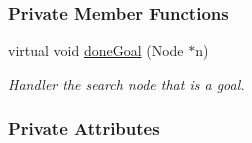 \subsubsection*{Private Member Functions}
\begin{DoxyCompactItemize}
\item 
virtual void \hyperlink{structslb_1_1ext_1_1policy_1_1goalHandler_1_1SingleGoal_ad6a96ee6aa23de81c67f7714c51effae}{done\+Goal} (Node $\ast$n)
\begin{DoxyCompactList}\small\item\em Handler the search node that is a goal. \end{DoxyCompactList}\end{DoxyCompactItemize}
\subsubsection*{Private Attributes}
